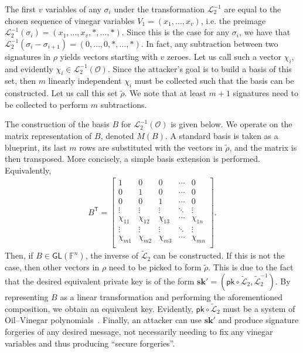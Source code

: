 \documentclass[12pt, a4paper, oneside]{memoir}
\theoremstyle{definition}
\begin{document}
The first $v$ variables of any $\sigma_{i}$ under the transformation $\mathcal{L}_{2}^{-1}$ are equal to the chosen sequence of vinegar variables $V_{1} = (x_{1}, \dots, x_{v})$, i.e. the preimage $\mathcal{L}_{2}^{-1}(\sigma_{i}) = (x_{1}, \dots, x_{v}, \ast, \dots, \ast)$. Since this is the case for any $\sigma_{i}$, we have that $\mathcal{L}_{2}^{-1}(\sigma_{i} - \sigma_{i + 1}) = (0, \dots, 0, \ast, \dots, \ast)$. In fact, any subtraction between two signatures in $\rho$ yields vectors starting with $v$ zeroes. Let us call such a vector $\chi_{i}$, and evidently $\chi_{i} \in \mathcal{L}_{2}^{-1}(\mathcal{O})$. Since the attacker's goal is to build a basis of this set, then $m$ linearly independent $\chi_{i}$ must be collected such that the basis can be constructed. Let us call this set $\widetilde{\rho}$. We note that at least $m + 1$ signatures need to be collected to perform $m$ subtractions.

The construction of the basis $B$ for $\mathcal{L}_{2}^{-1}(\mathcal{O})$ is given below. We operate on the matrix representation of $B$, denoted $M(B)$. A standard basis is taken as a blueprint, its last $m$ rows are substituted with the vectors in $\widetilde{\rho}$, and the matrix is then transposed. More concisely, a simple basis extension is performed. Equivalently,
\begin{align}
  B^{\mathsf{T}} = \begin{bmatrix}
    1 & 0 & 0 & \cdots & 0 \\
    0 & 1 & 0 & \cdots & 0 \\
    0 & 0 & 1 & \cdots & 0 \\
    \vdots & \vdots & \vdots & \ddots & \vdots \\
    \chi_{11} & \chi_{12} & \chi_{13} & \cdots & \chi_{1n} \\
        \vdots & \vdots & \vdots & \ddots & \vdots \\
    \chi_{m1} & \chi_{m2} & \chi_{m3} & \cdots & \chi_{mn} \\
  \end{bmatrix}.
\end{align}
Then, if $B \in \mathsf{GL}(\mathbb{F}^{n})$, the inverse of $\widetilde{\mathcal{L}}_{2}$ can be constructed. If this is not the case, then other vectors in $\rho$ need to be picked to form $\widetilde{\rho}$. This is due to the fact that the desired equivalent private key is of the form $\mathbf{sk'} = (\mathsf{pk} \circ \widetilde{\mathcal{L}}_{2}, \widetilde{\mathcal{L}}_{2}^{-1})$. By representing $B$ as a linear transformation and performing the aforementioned composition, we obtain an equivalent key. Evidently, $\mathsf{pk} \circ \widetilde{\mathcal{L}}_{2}$ must be a system of Oil--Vinegar polynomials~\cite[Theorem 1]{Beullens:201706}. Finally, an attacker can use $\mathbf{sk'}$ and produce signature forgeries of any desired message, not necessarily needing to fix any vinegar variables and thus producing ``secure forgeries''.
\end{document}
